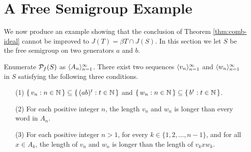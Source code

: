 \section{A Free Semigroup Example}
\label{sec:example}

We now produce an example showing that the conclusion of Theorem \ref{thm:comb-ideal} cannot be improved to $J(T) = \beta T \cap J(S)$.
In this section we let $S$ be the free semigroup on two generators $a$ and $b$.

\begin{lem}
  \label{lem:seqs}
  Enumerate $\mathcal{P}_f(S)$ as $\langle A_n \rangle_{n=1}^\infty$.
  There exist two sequences $\langle v_n \rangle_{n=1}^\infty$ and $\langle w_n \rangle_{n=1}^\infty$ in $S$ satisfying the following three conditions.
  \begin{itemize}
    \item[(1)]
      $\{\, v_n : n \in \mathbb{N} \,\} \subseteq \{\, (ab)^t : t \in \mathbb{N} \,\}$ and $\{\, w_n : n \in \mathbb{N} \,\} \subseteq \{\, b^t : t \in \mathbb{N} \,\}$.

    \item[(2)]
      For each positive integer $n$, the length $v_n$ and $w_n$ is longer than every word in $A_n$.

    \item[(3)]
      For each positive integer $n > 1$, for every $k \in \{1, 2, \ldots, n-1\}$, and for all $x \in A_k$, the length of $v_n$ and $w_n$ is longer than the length of $v_kxw_k$.
  \end{itemize}
\end{lem}
